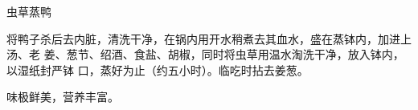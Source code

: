 \begin{recipe}{虫草蒸鸭}

\ingredients


\preparation

将鸭子杀后去内脏，清洗干净，在锅内用开水稍煮去其血水，盛在蒸钵内，加进上汤、老
姜、葱节、绍酒、食盐、胡椒，同时将虫草用温水淘洗干净，放入钵内，以湿纸封严钵
口，蒸好为止（约五小时）。临吃时拈去姜葱。

\features

味极鲜美，营养丰富。

\end{recipe}

